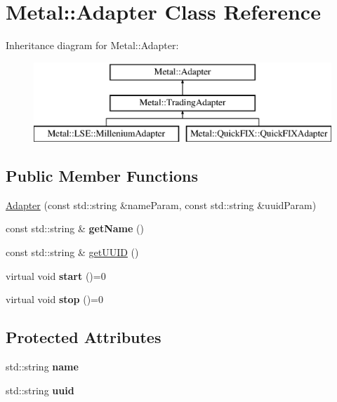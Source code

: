 \hypertarget{classMetal_1_1Adapter}{}\section{Metal\+:\+:Adapter Class Reference}
\label{classMetal_1_1Adapter}
Inheritance diagram for Metal\+:\+:Adapter\+:\begin{figure}[H]
\begin{center}
\leavevmode
\includegraphics[height=3.000000cm]{classMetal_1_1Adapter}
\end{center}
\end{figure}
\subsection*{Public Member Functions}
\begin{DoxyCompactItemize}
\item 
\hyperlink{classMetal_1_1Adapter_a04519bef3780569a6e1bd26865b69577}{Adapter} (const std\+::string \&name\+Param, const std\+::string \&uuid\+Param)
\item 
\hypertarget{classMetal_1_1Adapter_a548dd70ecda0b21ddf3a459719d10377}{}const std\+::string \& {\bfseries get\+Name} ()\label{classMetal_1_1Adapter_a548dd70ecda0b21ddf3a459719d10377}

\item 
const std\+::string \& \hyperlink{classMetal_1_1Adapter_acd274a92f404cdc435a4d7030a7b1b58}{get\+U\+U\+I\+D} ()
\item 
\hypertarget{classMetal_1_1Adapter_a2c51b1d584d5110384782e4d535f52dc}{}virtual void {\bfseries start} ()=0\label{classMetal_1_1Adapter_a2c51b1d584d5110384782e4d535f52dc}

\item 
\hypertarget{classMetal_1_1Adapter_afac53c6c3aa80b5d09519b1daa0ccf86}{}virtual void {\bfseries stop} ()=0\label{classMetal_1_1Adapter_afac53c6c3aa80b5d09519b1daa0ccf86}

\end{DoxyCompactItemize}
\subsection*{Protected Attributes}
\begin{DoxyCompactItemize}
\item 
\hypertarget{classMetal_1_1Adapter_a6f0924d1c38de9c07c2fee73ce75d5f6}{}std\+::string {\bfseries name}\label{classMetal_1_1Adapter_a6f0924d1c38de9c07c2fee73ce75d5f6}

\item 
\hypertarget{classMetal_1_1Adapter_a20096a0f4ad14b746ca2e1f58ac4a969}{}std\+::string {\bfseries uuid}\label{classMetal_1_1Adapter_a20096a0f4ad14b746ca2e1f58ac4a969}

\end{DoxyCompactItemize}


